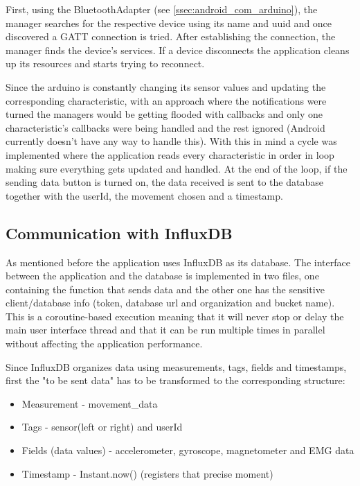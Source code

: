First, using the BluetoothAdapter (see \ref{ssec:android_com_arduino}), the manager searches for the respective device using its name and uuid and once discovered a \gls{GATT} connection is tried. After establishing the connection, 
the manager finds the device's services. If a device disconnects the application cleans up its resources and starts trying to reconnect.

Since the arduino is constantly changing its sensor values and updating the corresponding characteristic, with an approach where the notifications were turned the managers would be getting flooded with callbacks and only one characteristic's 
callbacks were being handled and the rest ignored (Android currently doesn't have any way to handle this). With this in mind a cycle was implemented where the application reads every characteristic in order in loop making sure 
everything gets updated and handled. At the end of the loop, if the sending data button is turned on, the data received is sent to the database together with the userId, the movement chosen and a timestamp. 

\subsection{Communication with InfluxDB}
\label{ssec:android_com_data_base}

As mentioned before the application uses InfluxDB as its database. The interface between the application and the database is implemented in two files, one containing the function that sends data and the other one has the sensitive 
client/database info (token, database url and organization and bucket name). This is a coroutine-based execution meaning that it will never stop or delay the main user interface thread and that it can be run multiple times in parallel 
without affecting the application performance.

Since InfluxDB organizes data using measurements, tags, fields and timestamps, first the "to be sent data" has to be transformed to the corresponding structure:

\begin{itemize}
    \item Measurement - movement\_data
    \item Tags - sensor(left or right) and userId
    \item Fields (data values) - accelerometer, gyroscope, magnetometer and \gls{EMG} data
    \item Timestamp - Instant.now() (registers that precise moment)
\end{itemize}

